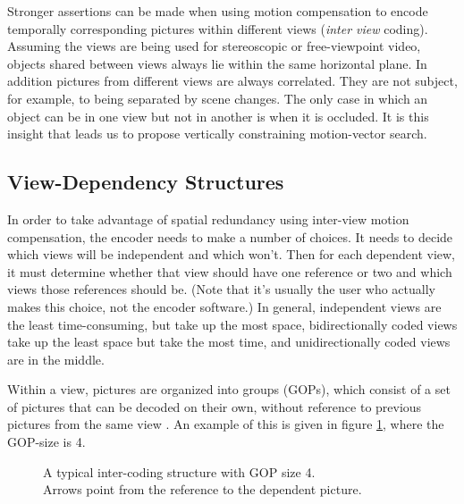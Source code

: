 \documentclass{sig-alternate-05-2015}
\begin{document}
Stronger assertions can be made when using motion compensation to encode
temporally corresponding pictures within different views ({\it inter view}
coding). Assuming the views are being used for stereoscopic or free-viewpoint
video, objects shared between views always lie within the same horizontal plane.
In addition pictures from different views are always correlated. They are not
subject, for example, to being separated by scene changes. The only case in
which an object can be in one view but not in another is when it is occluded. It
is this insight that leads us to propose vertically constraining motion-vector
search.

\subsection{View-Dependency Structures}
\label{subsec:depends}
In order to take advantage of spatial redundancy using inter-view motion
compensation, the encoder needs to make a number of choices. It needs to decide
which views will be independent and which won't. Then for each dependent view,
it must determine whether that view should have one reference or two and which
views those references should be. (Note that it's usually the user who actually
makes this choice, not the encoder software.) In general, independent views are
the least time-consuming, but take up the most space, bidirectionally coded views
take up the least space but take the most time, and unidirectionally coded views
are in the middle.

Within a view, pictures are organized into groups (GOPs), which consist of a set
of pictures that can be decoded on their own, without reference to previous
pictures from the same view \cite{vetro:overview}. An example of this is given in
figure \ref{fig:inter}, where the GOP-size is 4.

\begin{figure}[H]
\begin{center}
\end{center}
\caption{
A typical inter-coding structure with GOP size 4. \\
Arrows point from the reference to the dependent picture.
}
\label{fig:inter}
\end{figure}
\end{document}
